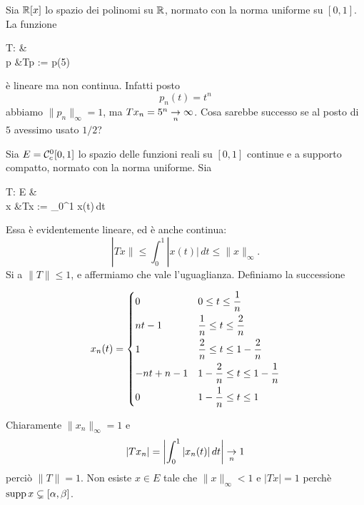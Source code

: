 \begin{example}
	Sia $\R[x]$ lo spazio dei polinomi su $\R$, normato con la norma uniforme su $[0,1]$. La funzione
	\begin{eqalign}
		T: \R[x] &\longto \R\\
		p &\longmapsto Tp := p(5)
	\end{eqalign}
	è lineare ma non continua. Infatti posto
	$$
		p_n(t) = t^n
	$$
	abbiamo $\|p_n\|_\infty = 1$, ma $Tx_n = 5^n \conv[n] \infty$. Cosa sarebbe successo se al posto di $5$ avessimo usato $1/2$?
\end{example}
\begin{example}
	Sia $E=\Czero_c[0,1]$ lo spazio delle funzioni reali su $[0,1]$ continue e a supporto compatto, normato con la norma uniforme. Sia
	\begin{eqalign}
		T: E &\longto \R\\
		x &\longmapsto Tx := \int_0^1 x(t)\,dt
	\end{eqalign}
	Essa è evidentemente lineare, ed è anche continua:
	$$
		|Tx\| \leq \int_0^1 |x(t)|\,dt \leq \|x\|_\infty.
	$$
	Si a $\|T\| \leq 1$, e affermiamo che vale l'uguaglianza. Definiamo la successione

	\begin{minipage}[c]{\textwidth}
		\begin{minipage}[c]{.48\textwidth}
			$$
				x_n(t) = \begin{dcases}
					0 & 0 \leq t \leq \frac1n\\
					nt-1 & \frac1n \leq t \leq \frac2n\\
					1 & \frac2n \leq t \leq 1-\frac2n\\
					-nt+n-1 & 1-\frac2n \leq t \leq 1-\frac1n\\
					0 & 1-\frac1n \leq t \leq 1
				\end{dcases}
			$$
		\end{minipage}%
		\begin{minipage}[c]{.48\textwidth}
			\begin{figure}[H]
				\centering
			\end{figure}
		\end{minipage}
	\end{minipage}
	\vspace{3ex}

	Chiaramente $\|x_n\|_\infty = 1$ e
	$$
		|Tx_n| = \left| \int_0^1 |x_n(t)|\,dt \right| \conv[n] 1
	$$
	perciò $\|T\|=1$. Non esiste $x \in E$ tale che $\|x\|_\infty < 1$ e $|Tx| =1$ perchè $\supp x \subsetneq [\alpha, \beta]$.
\end{example}

